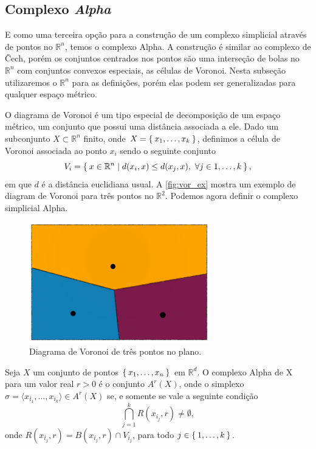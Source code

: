 \subsection{Complexo \textit{Alpha}}
E como uma terceira opção para a construção de um complexo simplicial através
de pontos no $\mathbb{R}^n$, temos o complexo Alpha. A construção é similar
ao complexo de \v{C}ech, porém os conjuntos centrados nos pontos são uma
interseção de bolas no $\mathbb{R}^n$ com conjuntos convexos especiais,
as células de Voronoi. Nesta subseção utilizaremos o $\mathbb{R}^n$ para as definições, porém elas podem ser generalizadas para qualquer espaço métrico.

O diagrama de Voronoi é um tipo especial de decomposição de um espaço métrico,
um conjunto que possui uma distância associada a ele.
Dado um subconjunto $X \subset \mathbb{R}^n$ finito, onde $X=\Set{x_1, \dots, x_k}$,
definimos a célula de Voronoi associada ao ponto $x_i$ sendo o seguinte conjunto
\begin{equation*}
  V_i = \Set{x\in \mathbb{R}^n | d(x_i, x) \leq d(x_j, x), \ \forall j \in {1,\dots,k}},
\end{equation*}
em que $d$ é a distância euclidiana usual. A \autoref{fig:vor_ex} mostra um
exemplo de diagram de Voronoi para três pontos no $\mathbb{R}^2$. Podemos agora
definir o complexo simplicial Alpha.

\begin{figure}[!htpb]
  \centering
  \includegraphics[width=0.7\textwidth]{images/voronoi_diagram.png}
  \caption{Diagrama de Voronoi de três pontos no plano.}
  \label{fig:vor_ex}
  \fautor
\end{figure}

\begin{defi}
  Seja $X$ um conjunto de pontos $\Set{x_1, \dots, x_n}$ em $\mathbb{R}^d$. O complexo
  Alpha de X para um valor real $r>0$ é o conjunto $A^r(X)$, onde o simplexo
  $\sigma = \langle x_{i_1}, \dots, x_{i_k} \rangle \in A^r(X)$ se, e somente se vale a seguinte
  condição
  \begin{equation*}
    \bigcap_{j=1}^k R(x_{i_j},r) \neq \emptyset,
  \end{equation*}
  onde $R(x_{i_j},r) = B(x_{i_j}, r) \cap V_{i_j}$, para todo $j \in \Set{1,\dots,k}$.
\end{defi}

